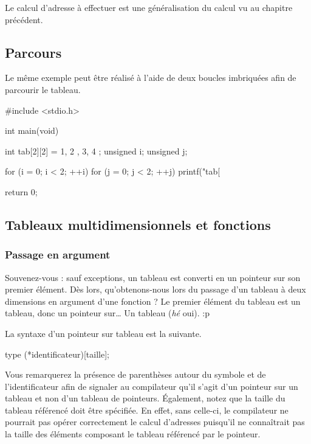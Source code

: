 Le calcul d'adresse à effectuer est une généralisation du calcul vu au
chapitre précédent.

\subsection{Parcours}
\label{parcours}

Le même exemple peut être réalisé à l'aide de deux boucles imbriquées
afin de parcourir le tableau.

\begin{C}
#include <stdio.h>


int main(void)
{
    int tab[2][2] = { { 1, 2 }, { 3, 4 } };
    unsigned i;
    unsigned j;

    for (i = 0; i < 2; ++i)
        for (j = 0; j < 2; ++j)
            printf("tab[%

    return 0;
}
\end{C}

\subsection{Tableaux multidimensionnels et fonctions}
\label{tableaux-multidimensionnels-et-fonctions}

\subsubsection{Passage en argument}
\label{passage-en-argument}

Souvenez-vous : sauf exceptions, un tableau est converti en un pointeur
sur son premier élément. Dès lors, qu'obtenons-nous lors du passage d'un
tableau à deux dimensions en argument d'une fonction ? Le premier
élément du tableau est un tableau, donc un pointeur sur\ldots{} Un
tableau (\emph{hé} oui). :p

La syntaxe d'un pointeur sur tableau est la suivante.

\begin{C}
type (*identificateur)[taille];
\end{C}

Vous remarquerez la présence de parenthèses autour du symbole \mybox{*}
et de l'identificateur afin de signaler au compilateur qu'il s'agit d'un
pointeur sur un tableau et non d'un tableau de pointeurs. Également,
notez que la taille du tableau référencé doit être spécifiée. En effet,
sans celle-ci, le compilateur ne pourrait pas opérer correctement le
calcul d'adresses puisqu'il ne connaîtrait pas la taille des éléments
composant le tableau référencé par le pointeur.

